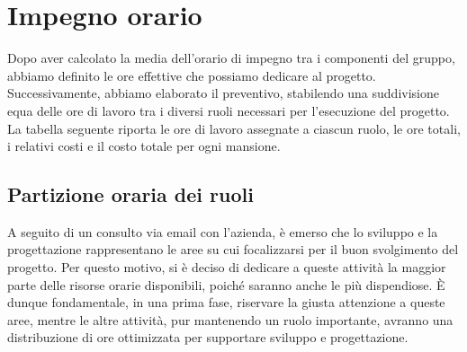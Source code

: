 \section{Impegno orario}

Dopo aver calcolato la media dell’orario di impegno tra i componenti del gruppo, abbiamo definito le ore effettive che possiamo dedicare al progetto. Successivamente, abbiamo elaborato il preventivo, stabilendo una suddivisione equa delle ore di lavoro tra i diversi ruoli necessari per l’esecuzione del progetto. La tabella seguente riporta le ore di lavoro assegnate a ciascun ruolo, le ore totali, i relativi costi e il costo totale per ogni mansione.

\vspace{0.5cm}

\begin{table}[h]
    \centering
    \caption{Ripartizione oraria e dettaglio dei costi}
\end{table}

\vspace{0.5cm}

\subsection{Partizione oraria dei ruoli}
A seguito di un consulto via email con l'azienda, è emerso che lo sviluppo e la progettazione rappresentano le aree su cui focalizzarsi per il buon svolgimento del progetto. Per questo motivo, si è deciso di dedicare a queste attività la maggior parte delle risorse orarie disponibili, poiché saranno anche le più dispendiose. È dunque fondamentale, in una prima fase, riservare la giusta attenzione a queste aree, mentre le altre attività, pur mantenendo un ruolo importante, avranno una distribuzione di ore ottimizzata per supportare sviluppo e progettazione.

